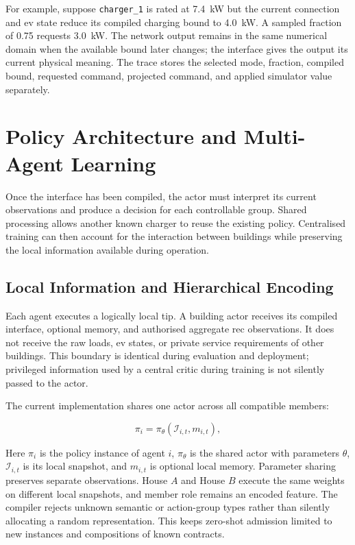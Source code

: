 For example, suppose \texttt{charger\_1} is rated at 7.4~kW but the current connection and \gls{ev} state reduce its compiled charging bound to 4.0~kW. A sampled fraction of 0.75 requests 3.0~kW. The network output remains in the same numerical domain when the available bound later changes; the interface gives the output its current physical meaning. The trace stores the selected mode, fraction, compiled bound, requested command, projected command, and applied simulator value separately.

\section{Policy Architecture and Multi-Agent Learning}
\label{sec:tip-and-learning}
\label{sec:timarl-multiagent-learning}

Once the interface has been compiled, the actor must interpret its current observations and produce a decision for each controllable group. Shared processing allows another known charger to reuse the existing policy. Centralised training can then account for the interaction between buildings while preserving the local information available during operation.

\subsection{Local Information and Hierarchical Encoding}
\label{sec:timarl-local-info}

Each agent executes a logically local \gls{tip}. A building actor receives its compiled interface, optional memory, and authorised aggregate \gls{rec} observations. It does not receive the raw loads, \gls{ev} states, or private service requirements of other buildings. This boundary is identical during evaluation and deployment; privileged information used by a central critic during training is not silently passed to the actor.

The current implementation shares one actor across all compatible members:

\begin{equation}
\pi_i
=
\pi_{\theta}
\left(
\mathcal{I}_{i,t},m_{i,t}
\right),
\label{eq:role-sharing}
\end{equation}

Here $\pi_i$ is the policy instance of agent $i$, $\pi_\theta$ is the shared actor with parameters $\theta$, $\mathcal I_{i,t}$ is its local snapshot, and $m_{i,t}$ is optional local memory. Parameter sharing preserves separate observations. House $A$ and House $B$ execute the same weights on different local snapshots, and member role remains an encoded feature. The compiler rejects unknown semantic or action-group types rather than silently allocating a random representation. This keeps zero-shot admission limited to new instances and compositions of known contracts.

